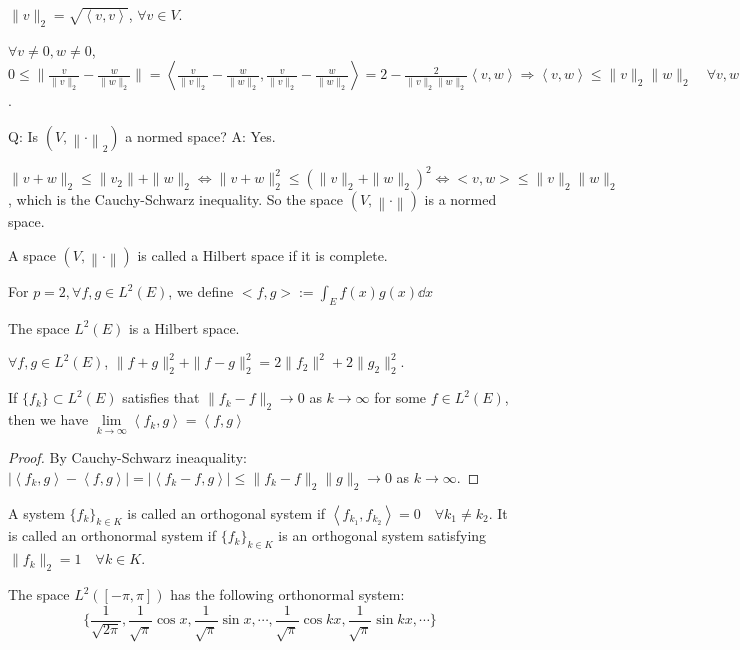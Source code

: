 \documentclass{article}
\begin{document}
\begin{Def}
$\|v\|_2=\sqrt{\left<v,v\right>}$, $\forall v\in V$.
\end{Def}

$\forall v\neq 0, w\neq 0$, $0\leq\|\frac{v}{\|v\|_2}-\frac{w}{\|w\|_2}\|=\left<\frac{v}{\|v\|_2}-\frac{w}{\|w\|_2},\frac{v}{\|v\|_2}-\frac{w}{\|w\|_2}\right>=2-\frac{2}{\|v\|_2\|w\|_2}\left<v,w\right>\Rightarrow\left<v,w\right>\leq \|v\|_2\|w\|_2\quad \forall v,w\in V$. 

Q: Is $(V,\left\|\cdot\right\|_2)$ a normed space? A: Yes.

$\|v+w\|_2\leq \|v_2\|+\|w\|_2\Leftrightarrow\|v+w\|_2^2\leq (\|v\|_2+\|w\|_2)^2\Leftrightarrow <v,w>\leq \|v\|_2\|w\|_2$, which is the Cauchy-Schwarz inequality. So the space $(V,\left\|\cdot\right\|)$ is a normed space.

\begin{Def}
A space $(V,\left\|\cdot\right\|)$ is called a Hilbert space if it is complete.
\end{Def}

For $p=2,\forall f,g\in L^2(E)$, we define $<f,g>:=\int_E f(x)g(x)\dd x$

\begin{Thm}
The space $L^2(E)$ is a Hilbert space.
\end{Thm}

$\forall f,g\in L^2(E)$, $\|f+g\|_2^2+\|f-g\|_2^2=2\|f_2\|^2+2\|g_2\|_2^2$.

\begin{Thm}[Continuity]
If $\{f_k\}\subset L^2(E)$ satisfies that $\|f_k-f\|_2\to 0$ as $k\to\infty$ for some $f\in L^2(E)$, then we have $\lim\limits_{k\to\infty}\left<f_k,g\right>=\left<f,g\right>$
\end{Thm}
\begin{proof}
By Cauchy-Schwarz ineaquality:
$|\left<f_k,g\right>-\left<f,g\right>|=|\left<f_k-f,g\right>|\leq \|f_k-f\|_2\|g\|_2\to 0$ as $k\to\infty$.
\end{proof}

\begin{Def}
A system $\{f_k\}_{k\in K}$ is called an orthogonal system if $\left<f_{k_1},f_{k_2}\right>=0\quad \forall k_1\neq k_2$. It is called an orthonormal system if $\{f_k\}_{k\in K}$ is an orthogonal system satisfying $\|f_k\|_2=1\quad \forall k\in K$.
\end{Def}

\begin{Eg}
The space $L^2([-\pi,\pi])$ has the following orthonormal system:
\[\{\frac{1}{\sqrt{2\pi}}, \frac{1}{\sqrt{\pi}}\cos x,\frac{1}{\sqrt{\pi}}\sin x,\cdots,\frac{1}{\sqrt{\pi}}\cos kx,\frac{1}{\sqrt{\pi}}\sin kx,\cdots\}\]
\end{Eg}
\end{document}
